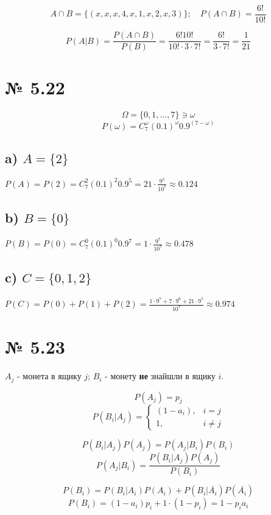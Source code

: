 \documentclass[11pt, a4paper]{article} %
\begin{document}
$$A\cap B = \{(x,x,x,4,x,1,x,2,x,3)\};\quad 
P(A\cap B) = \frac{6!}{10!}$$

\begin{mdframed}[style=ans]
\begin{equation*}
    P(A|B) = \frac{P(A\cap B)}{P(B)} = \frac{6!10!}{10!\cdot 3\cdot 7!} = \frac{6!}{3\cdot 7!} = \frac{1}{21}
\end{equation*}
\end{mdframed}

\section*{№ 5.22}
$$\Omega = \{0,1,...,7\} \ni \omega$$
$$P(\omega) = C_7^\omega (0.1)^\omega 0.9^(7-\omega)$$

\subsection*{a) $A=\{2\}$}
$P(A) = P(2) = C_7^2 (0.1)^2 0.9^5 = 21 \cdot \frac{9^5}{10^7} \approx 0.124$

\subsection*{b) $B=\{0\}$}
$P(B) = P(0) = C_7^0 (0.1)^0 0.9^7 = 1 \cdot \frac{9^7}{10^7} \approx 0.478$

\subsection*{c) $C=\{0,1,2\}$}
$P(C) = P(0)+P(1)+P(2) = \frac{1\cdot 9^7 + 7\cdot 9^6 + 21\cdot 9^5}{10^7} \approx 0.974$

\section*{№ 5.23}
$A_j$ - монета в ящику $j$; $B_i$ - монету \textbf{не} знайшли в ящику $i$.

$$P(A_j) = p_j$$
$$P(B_i|A_j) = 
\begin{cases}
    (1-a_i), & i=j\\
    1, & i \ne j
\end{cases}$$

$$P(B_i|A_j) P(A_j) = P(A_j|B_i) P(B_i)$$
$$P(A_j|B_i) = \frac{P(B_i|A_j) P(A_j)}{P(B_i)}$$

$$P(B_i) = P(B_i|A_i)P(A_i) + P(B_i|\overline{A_i})P(\overline{A_i})$$
$$P(B_i) = (1-a_i)p_i + 1\cdot (1-p_i) = 1 - p_i a_i$$
\end{document}
